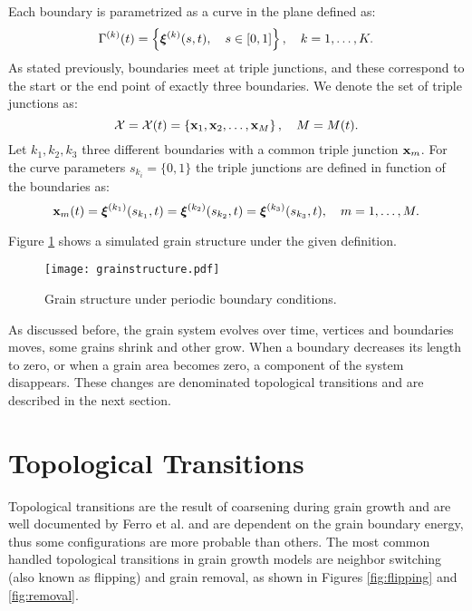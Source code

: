 Each boundary is parametrized as a curve in the plane defined as:
\begin{equation}
    \Gamma^{(k)}(t) = \left\{ \bm{\xi}^{(k)}(s,t), \quad s \in [0, 1] \right\},\quad k = 1, \dotsc, K.
    \label{eq:grainboundary}
\end{equation}
As stated previously, boundaries meet at triple junctions, and these correspond to the start or the end point of exactly three boundaries. We denote the set of triple junctions as:
\begin{equation}
    \vertices = \vertices(t) = \left\{ \x_1, \x_2, \dotsc, \x_M \right\},\quad M = M(t).
\end{equation}
Let $k_1, k_2, k_3$ three different boundaries with a common triple junction $\x_m$. For the curve parameters $s_{k_i} = \{0,1\}$ the triple junctions are defined in function of the boundaries as:
\begin{equation*}
    \x_{m}(t) =  \vxi^{(k_1)} (s_{k_1},t) = \vxi^{(k_2)} (s_{k_2},t) = \vxi^{(k_3)} (s_{k_3},t),\quad m =1,\dotsc,M.
\end{equation*}

Figure \ref{fig:grainstructure} shows a simulated grain structure under the given definition.
\begin{figure}[t]
    \centering
    \texttt{[image: grainstructure.pdf]}
    \caption{Grain structure under periodic boundary conditions.}
    \label{fig:grainstructure}
\end{figure}
As discussed before, the grain system evolves over time, vertices and boundaries moves, some grains shrink and other grow. When a boundary decreases its length to zero, or when a grain area becomes zero, a component of the system disappears. These changes are denominated topological transitions and are described in the next section.

\section{Topological Transitions}

Topological transitions are the result of coarsening during grain growth and are well documented by Ferro et al. \cite{ferro1997elimination} and are dependent on the grain boundary energy, thus some configurations are more probable than others. The most common handled topological transitions \cite{kinderlehrermultiscale, Kinderlehrer2006, torres2015, van2016curvature} in grain growth models are neighbor switching (also known as flipping) and grain removal, as shown in Figures \ref{fig:flipping} and \ref{fig:removal}.

